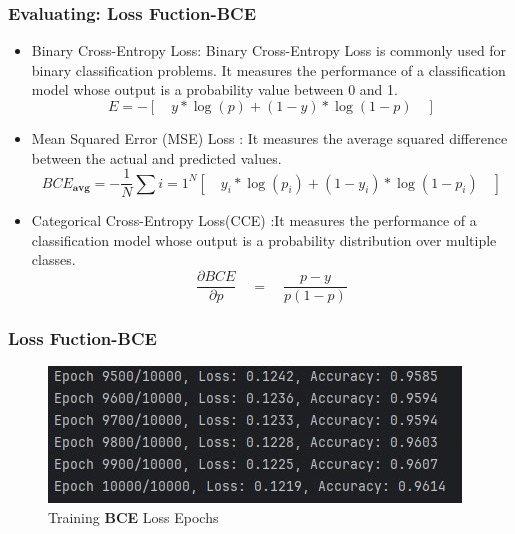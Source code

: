 \documentclass[aspectratio=1610]{beamer}
\begin{document}
\begin{frame}
    \frametitle{Evaluating: Loss Fuction-BCE}
    \begin{itemize}

        \item Binary Cross-Entropy Loss: Binary Cross-Entropy Loss is commonly used for binary classification problems. It measures the performance of a classification model whose output is a probability value between 0 and 1.    
            \[
              E = -\left[\quad y * \log(p) + (1 - y) * \log(1 - p) \quad\right]
            \]

        \item Mean Squared Error (MSE) Loss  : It measures the average squared difference between the actual and predicted values.
            \[
                BCE_{\textbf{avg}} = - \frac{1}{N} \sum i = 1^N \left[\quad y_i * \log(p_i) + (1 - y_i) * \log(1 - p_i) \quad\right]
            \]
        \item Categorical Cross-Entropy Loss(CCE) :It measures the performance of a classification model whose output is a probability distribution over multiple classes. 
            \[
            \frac{\partial BCE }{\partial p}  \quad=\quad \frac{p-y }{p(1-p)} \]
    \end{itemize}
\end{frame}

\begin{frame}
    \frametitle{ Loss Fuction-BCE}
   \begin{figure}
            \begin{center}
                \includegraphics[width=1\linewidth]{BCE.jpg}
                \caption{Training \textbf{BCE} Loss Epochs }
                \label{fig:modelE}
            \end{center}
        
    \end{figure}
\end{frame}
\end{document}
